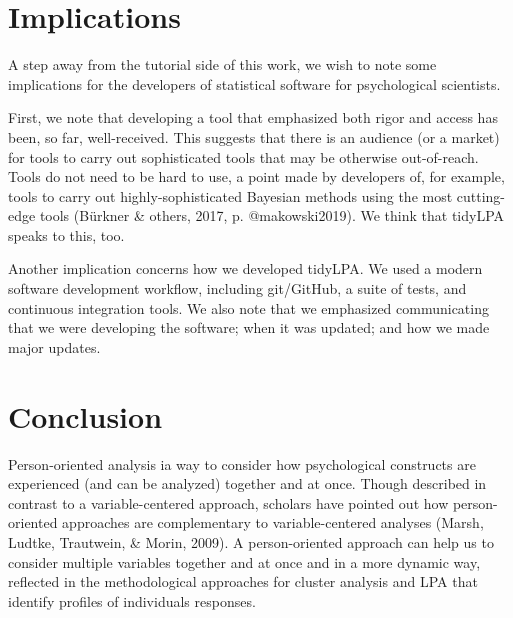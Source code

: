 \documentclass[
  english,
  man]{apa6}
\begin{document}
\hypertarget{implications}{%
\section{Implications}\label{implications}}

A step away from the tutorial side of this work, we wish to note some implications
for the developers of statistical software for psychological scientists.

First, we note that developing a tool that emphasized both rigor and access has
been, so far, well-received. This suggests that there is an audience (or a
market) for tools to carry out sophisticated tools that may be otherwise
out-of-reach. Tools do not need to be hard to use, a point made by developers
of, for example, tools to carry out highly-sophisticated Bayesian methods using
the most cutting-edge tools (Bürkner \& others, 2017, p. @makowski2019). We think
that tidyLPA speaks to this, too.

Another implication concerns how we developed tidyLPA. We used a modern software
development workflow, including git/GitHub, a suite of tests, and continuous
integration tools. We also note that we emphasized communicating that we were
developing the software; when it was updated; and how we made major updates.

\hypertarget{conclusion}{%
\section{Conclusion}\label{conclusion}}

Person-oriented analysis ia way to consider how psychological constructs are
experienced (and can be analyzed) together and at once. Though described in
contrast to a variable-centered approach, scholars have pointed out how
person-oriented approaches are complementary to variable-centered analyses
(Marsh, Ludtke, Trautwein, \& Morin, 2009). A person-oriented approach can help
us to consider multiple variables together and at once and in a more dynamic
way, reflected in the methodological approaches for cluster analysis and LPA
that identify profiles of individuals responses.
\end{document}
